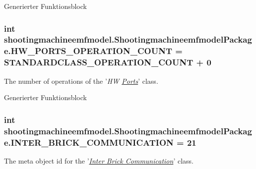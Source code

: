 Generierter Funktionsblock  \hypertarget{interfaceshootingmachineemfmodel_1_1_shootingmachineemfmodel_package_a5f85f99a2b80ea1b9f8c81dc620e69b3}{
\subsubsection[{H\-W\-\_\-\-P\-O\-R\-T\-S\-\_\-\-O\-P\-E\-R\-A\-T\-I\-O\-N\-\_\-\-C\-O\-U\-N\-T}]{\setlength{\rightskip}{0pt plus 5cm}int shootingmachineemfmodel.\-Shootingmachineemfmodel\-Package.\-H\-W\-\_\-\-P\-O\-R\-T\-S\-\_\-\-O\-P\-E\-R\-A\-T\-I\-O\-N\-\_\-\-C\-O\-U\-N\-T = {\bf S\-T\-A\-N\-D\-A\-R\-D\-C\-L\-A\-S\-S\-\_\-\-O\-P\-E\-R\-A\-T\-I\-O\-N\-\_\-\-C\-O\-U\-N\-T} + 0}}\label{interfaceshootingmachineemfmodel_1_1_shootingmachineemfmodel_package_a5f85f99a2b80ea1b9f8c81dc620e69b3}
The number of operations of the '{\itshape H\-W \hyperlink{interfaceshootingmachineemfmodel_1_1_ports}{Ports}}' class.

Generierter Funktionsblock  \hypertarget{interfaceshootingmachineemfmodel_1_1_shootingmachineemfmodel_package_ae54fb130a6b1815edc13aeaabc6a3f29}{
\subsubsection[{I\-N\-T\-E\-R\-\_\-\-B\-R\-I\-C\-K\-\_\-\-C\-O\-M\-M\-U\-N\-I\-C\-A\-T\-I\-O\-N}]{\setlength{\rightskip}{0pt plus 5cm}int shootingmachineemfmodel.\-Shootingmachineemfmodel\-Package.\-I\-N\-T\-E\-R\-\_\-\-B\-R\-I\-C\-K\-\_\-\-C\-O\-M\-M\-U\-N\-I\-C\-A\-T\-I\-O\-N = 21}}\label{interfaceshootingmachineemfmodel_1_1_shootingmachineemfmodel_package_ae54fb130a6b1815edc13aeaabc6a3f29}
The meta object id for the '\hyperlink{classshootingmachineemfmodel_1_1impl_1_1_inter_brick_communication_impl}{{\itshape Inter Brick Communication}}' class.

